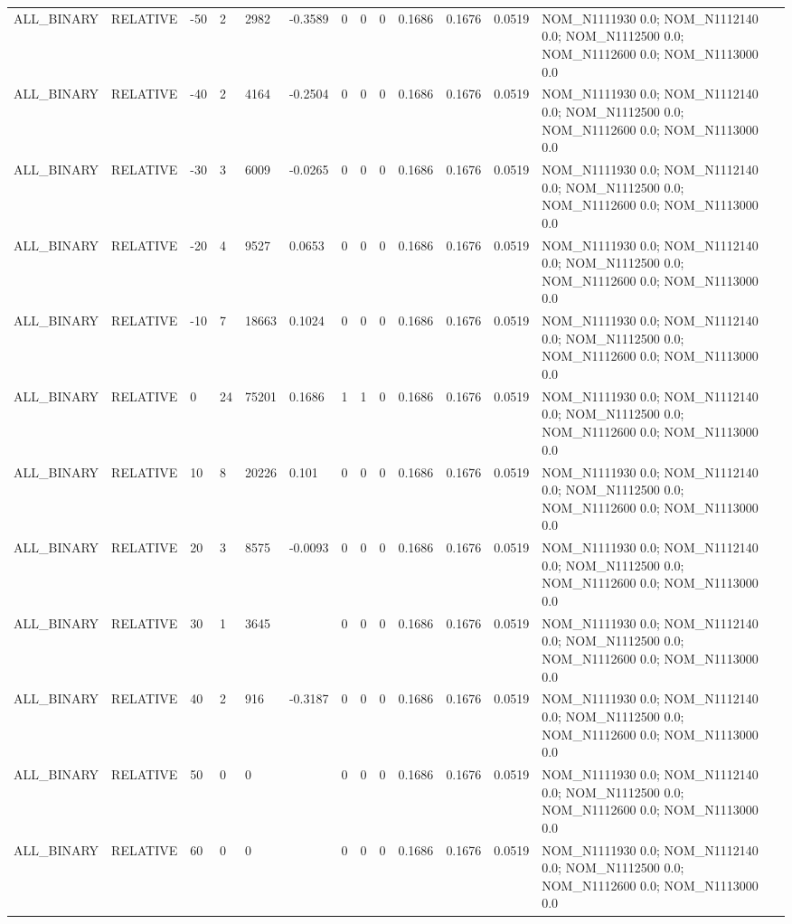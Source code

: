 \begin{table}[ht]
\begin{tabular}{lllllllllllll}
ALL\_BINARY & RELATIVE & -50 & 2 & 2982 & -0.3589 & 0 & 0 & 0 & 0.1686 & 0.1676 & 0.0519 & NOM\_N1111930 0.0; NOM\_N1112140 0.0; NOM\_N1112500 0.0; NOM\_N1112600 0.0; NOM\_N1113000 0.0 \\
ALL\_BINARY & RELATIVE & -40 & 2 & 4164 & -0.2504 & 0 & 0 & 0 & 0.1686 & 0.1676 & 0.0519 & NOM\_N1111930 0.0; NOM\_N1112140 0.0; NOM\_N1112500 0.0; NOM\_N1112600 0.0; NOM\_N1113000 0.0 \\
ALL\_BINARY & RELATIVE & -30 & 3 & 6009 & -0.0265 & 0 & 0 & 0 & 0.1686 & 0.1676 & 0.0519 & NOM\_N1111930 0.0; NOM\_N1112140 0.0; NOM\_N1112500 0.0; NOM\_N1112600 0.0; NOM\_N1113000 0.0 \\
ALL\_BINARY & RELATIVE & -20 & 4 & 9527 & 0.0653 & 0 & 0 & 0 & 0.1686 & 0.1676 & 0.0519 & NOM\_N1111930 0.0; NOM\_N1112140 0.0; NOM\_N1112500 0.0; NOM\_N1112600 0.0; NOM\_N1113000 0.0 \\
ALL\_BINARY & RELATIVE & -10 & 7 & 18663 & 0.1024 & 0 & 0 & 0 & 0.1686 & 0.1676 & 0.0519 & NOM\_N1111930 0.0; NOM\_N1112140 0.0; NOM\_N1112500 0.0; NOM\_N1112600 0.0; NOM\_N1113000 0.0 \\
ALL\_BINARY & RELATIVE & 0 & 24 & 75201 & 0.1686 & 1 & 1 & 0 & 0.1686 & 0.1676 & 0.0519 & NOM\_N1111930 0.0; NOM\_N1112140 0.0; NOM\_N1112500 0.0; NOM\_N1112600 0.0; NOM\_N1113000 0.0 \\
ALL\_BINARY & RELATIVE & 10 & 8 & 20226 & 0.101 & 0 & 0 & 0 & 0.1686 & 0.1676 & 0.0519 & NOM\_N1111930 0.0; NOM\_N1112140 0.0; NOM\_N1112500 0.0; NOM\_N1112600 0.0; NOM\_N1113000 0.0 \\
ALL\_BINARY & RELATIVE & 20 & 3 & 8575 & -0.0093 & 0 & 0 & 0 & 0.1686 & 0.1676 & 0.0519 & NOM\_N1111930 0.0; NOM\_N1112140 0.0; NOM\_N1112500 0.0; NOM\_N1112600 0.0; NOM\_N1113000 0.0 \\
ALL\_BINARY & RELATIVE & 30 & 1 & 3645 &  & 0 & 0 & 0 & 0.1686 & 0.1676 & 0.0519 & NOM\_N1111930 0.0; NOM\_N1112140 0.0; NOM\_N1112500 0.0; NOM\_N1112600 0.0; NOM\_N1113000 0.0 \\
ALL\_BINARY & RELATIVE & 40 & 2 & 916 & -0.3187 & 0 & 0 & 0 & 0.1686 & 0.1676 & 0.0519 & NOM\_N1111930 0.0; NOM\_N1112140 0.0; NOM\_N1112500 0.0; NOM\_N1112600 0.0; NOM\_N1113000 0.0 \\
ALL\_BINARY & RELATIVE & 50 & 0 & 0 &  & 0 & 0 & 0 & 0.1686 & 0.1676 & 0.0519 & NOM\_N1111930 0.0; NOM\_N1112140 0.0; NOM\_N1112500 0.0; NOM\_N1112600 0.0; NOM\_N1113000 0.0 \\
ALL\_BINARY & RELATIVE & 60 & 0 & 0 &  & 0 & 0 & 0 & 0.1686 & 0.1676 & 0.0519 & NOM\_N1111930 0.0; NOM\_N1112140 0.0; NOM\_N1112500 0.0; NOM\_N1112600 0.0; NOM\_N1113000 0.0 \\

\end{tabular}
\end{table}
